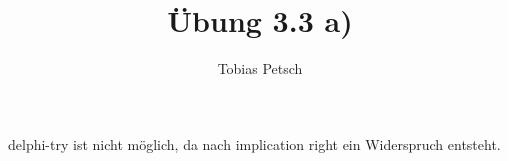 \documentclass[a4paper,12pt]{article}
\title{Übung 3.3 a)}
\author{Tobias Petsch}
\date{}
\begin{document}
\maketitle

delphi-try ist nicht möglich, da nach implication right ein Widerspruch entsteht.
\end{document}

